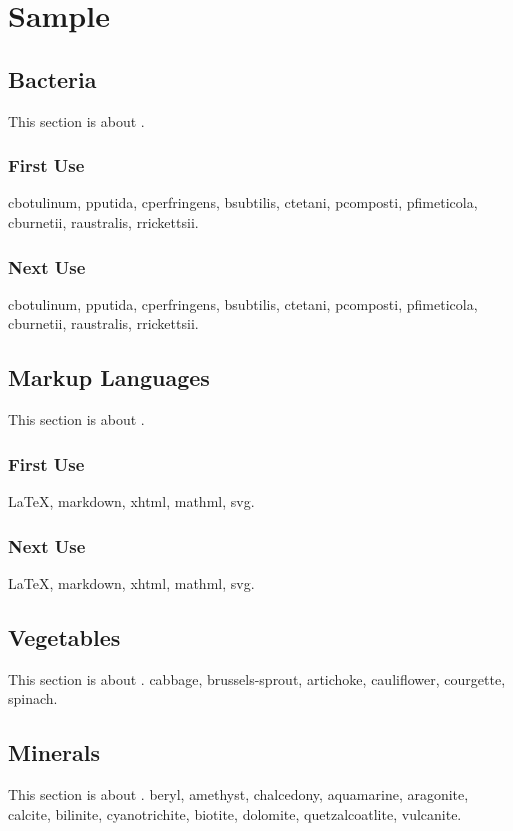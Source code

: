 \documentclass{scrreprt}
\begin{document}
\chapter{Sample}
\section{Bacteria}
This section is about .
\subsection{First Use}
\gls{cbotulinum}, \gls{pputida}, \gls{cperfringens},
\gls{bsubtilis}, \gls{ctetani}, \gls{pcomposti},
\gls{pfimeticola}, \gls{cburnetii}, \gls{raustralis},
\gls{rrickettsii}.

\subsection{Next Use}
\gls{cbotulinum}, \gls{pputida}, \gls{cperfringens},
\gls{bsubtilis}, \gls{ctetani}, \gls{pcomposti},
\gls{pfimeticola}, \gls{cburnetii}, \gls{raustralis},
\gls{rrickettsii}.

\section{Markup Languages}
This section is about .
\subsection{First Use}
\gls{LaTeX}, \gls{markdown}, \gls{xhtml}, \gls{mathml}, \gls{svg}.

\subsection{Next Use}
\gls{LaTeX}, \gls{markdown}, \gls{xhtml}, \gls{mathml}, \gls{svg}.

\section{Vegetables}
This section is about .
\Gls{cabbage}, \gls{brussels-sprout}, \gls{artichoke}, 
\gls{cauliflower}, \gls{courgette}, \gls{spinach}.

\section{Minerals}
This section is about .
\Gls{beryl}, \gls{amethyst}, \gls{chalcedony}, \gls{aquamarine},
\gls{aragonite}, \gls{calcite}, \gls{bilinite}, 
\gls{cyanotrichite}, \gls{biotite}, \gls{dolomite}, 
\gls{quetzalcoatlite}, \gls{vulcanite}.
\end{document}
